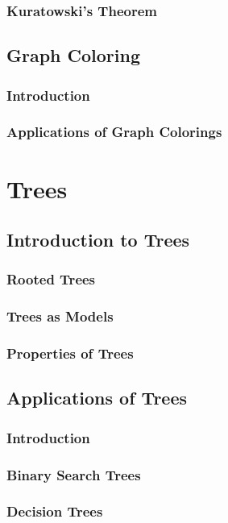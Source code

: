 \documentclass[11pt]{book}
\begin{document}
  \subsection{Kuratowski's Theorem}
  
 \section{Graph Coloring}
  \subsection{Introduction}
  \subsection{Applications of Graph Colorings}
 
\chapter{Trees}
 \section{Introduction to Trees}
  \subsection{Rooted Trees}
  \subsection{Trees as Models}
  \subsection{Properties of Trees}
  
 \section{Applications of Trees}
  \subsection{Introduction}
  \subsection{Binary Search Trees}
  \subsection{Decision Trees}
\end{document}
